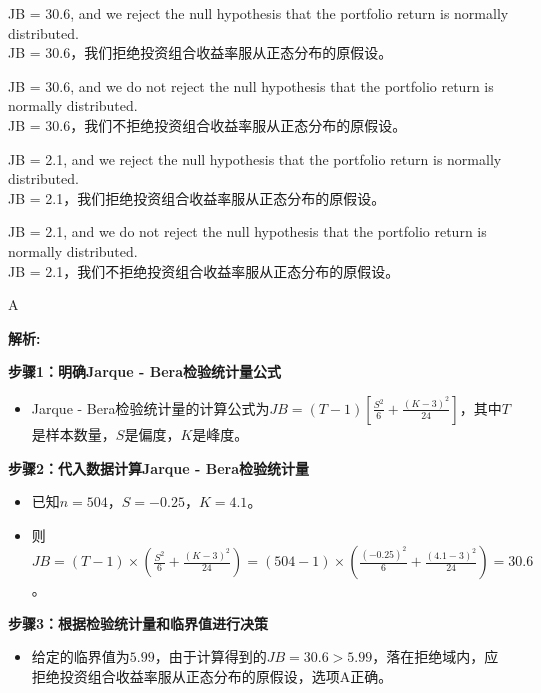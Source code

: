 \documentclass{article}
\newenvironment{explanation}
{\textbf{解析:}\par}
{\par}
\begin{document}
    \begin{choices}
        \item JB = 30.6, and we reject the null hypothesis that the portfolio return is normally distributed.\\
        JB = 30.6，我们拒绝投资组合收益率服从正态分布的原假设。
        \item JB = 30.6, and we do not reject the null hypothesis that the portfolio return is normally distributed.\\
        JB = 30.6，我们不拒绝投资组合收益率服从正态分布的原假设。
        \item JB = 2.1, and we reject the null hypothesis that the portfolio return is normally distributed.\\
        JB = 2.1，我们拒绝投资组合收益率服从正态分布的原假设。
        \item JB = 2.1, and we do not reject the null hypothesis that the portfolio return is normally distributed.\\
        JB = 2.1，我们不拒绝投资组合收益率服从正态分布的原假设。
    \end{choices}
    
    \begin{correctanswer}
        A
    \end{correctanswer}
    
    \begin{explanation}
    \textbf{步骤1：明确Jarque - Bera检验统计量公式}
    \begin{itemize}
        \item Jarque - Bera检验统计量的计算公式为\(JB=(T-1)\left[\frac{S^{2}}{6}+\frac{(K - 3)^{2}}{24}\right]\)，其中\(T\)是样本数量，\(S\)是偏度，\(K\)是峰度。
    \end{itemize}
    \textbf{步骤2：代入数据计算Jarque - Bera检验统计量}
    \begin{itemize}
        \item 已知\(n = 504\)，\(S=-0.25\)，\(K = 4.1\)。
        \item 则\(JB = (T-1)\times\left(\frac{S^{2}}{6}+\frac{(K - 3)^{2}}{24}\right)=(504-1)\times\left(\frac{(-0.25)^{2}}{6}+\frac{(4.1 - 3)^{2}}{24}\right)=30.6\)。
    \end{itemize}
    \textbf{步骤3：根据检验统计量和临界值进行决策}
    \begin{itemize}
        \item 给定的临界值为\(5.99\)，由于计算得到的\(JB = 30.6>5.99\)，落在拒绝域内，应拒绝投资组合收益率服从正态分布的原假设，选项A正确。
    \end{itemize}
    \end{explanation}
    
\end{document}
